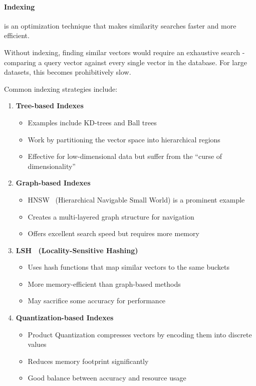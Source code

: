 \paragraph{Indexing} is an optimization technique that makes similarity searches faster and more efficient.

Without indexing, finding similar vectors would require an exhaustive search - comparing a query vector against every single vector in the database. For large datasets, this becomes prohibitively slow.

Common indexing strategies include:

\begin{enumerate}
    \item \textbf{Tree-based Indexes}
    \begin{itemize}
        \item Examples include KD-trees and Ball trees
        \item Work by partitioning the vector space into hierarchical regions  
        \item Effective for low-dimensional data but suffer from the ``curse of dimensionality''
    \end{itemize}

    \item \textbf{Graph-based Indexes}
    \begin{itemize}
        \item HNSW~ (Hierarchical Navigable Small World) is a prominent example
        \item Creates a multi-layered graph structure for navigation
        \item Offers excellent search speed but requires more memory
    \end{itemize}

    \item \textbf{LSH~ (Locality-Sensitive Hashing)}
    \begin{itemize}
        \item Uses hash functions that map similar vectors to the same buckets
        \item More memory-efficient than graph-based methods
        \item May sacrifice some accuracy for performance
    \end{itemize}

    \item \textbf{Quantization-based Indexes}
    \begin{itemize}
        \item Product Quantization compresses vectors by encoding them into discrete values
        \item Reduces memory footprint significantly
        \item Good balance between accuracy and resource usage
    \end{itemize}
\end{enumerate}
